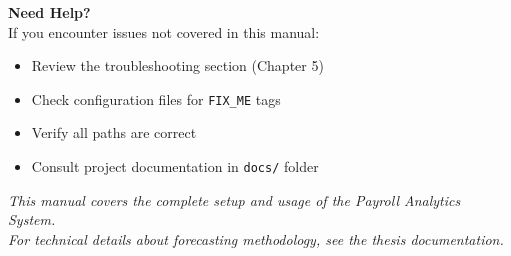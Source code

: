 \documentclass[11pt,a4paper]{article}
\begin{document}
\vspace{1cm}

\begin{tcolorbox}[colback=infobox, colframe=primaryblue]
\textbf{Need Help?}\\[0.3cm]
If you encounter issues not covered in this manual:
\begin{itemize}
    \item Review the troubleshooting section (Chapter 5)
    \item Check configuration files for \texttt{FIX\_ME} tags
    \item Verify all paths are correct
    \item Consult project documentation in \texttt{docs/} folder
\end{itemize}
\end{tcolorbox}

\vfill

\begin{center}
\textit{This manual covers the complete setup and usage of the Payroll Analytics System.\\
For technical details about forecasting methodology, see the thesis documentation.}
\end{center}
\end{document}
